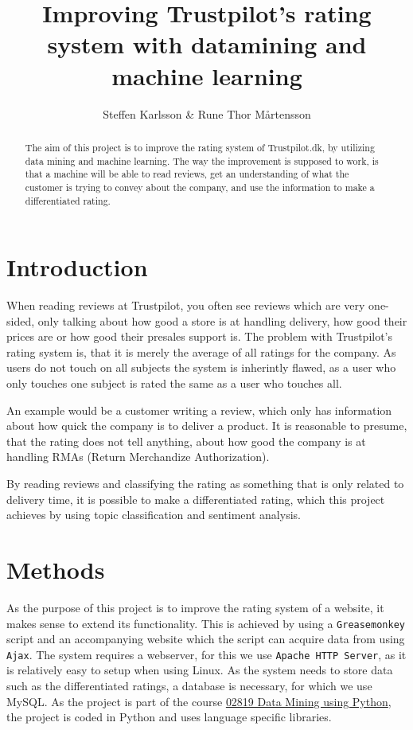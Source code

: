 \documentclass[10pt]{IEEEtran}
\title{Improving Trustpilot's rating system with datamining and machine learning}
\author{Steffen Karlsson \& Rune Thor Mårtensson}
\begin{document}
\maketitle

\begin{abstract}
The aim of this project is to improve the rating system of Trustpilot.dk, by utilizing data mining and machine learning. The way the improvement is supposed to work, is that a machine will be able to read reviews, get an understanding of what the customer is trying to convey about the company, and use the information to make a differentiated rating.
\end{abstract}

\section{Introduction}
When reading reviews at Trustpilot, you often see reviews which are very one-sided, only talking about how good a store is at handling delivery, how good their prices are or how good their presales support is. The problem with Trustpilot's rating system is, that it is merely the average of all ratings for the company. As users do not touch on all subjects the system is inherintly flawed, as a user who only touches one subject is rated the same as a user who touches all.

An example would be a customer writing a review, which only has information about how quick the company is to deliver a product. It is reasonable to presume, that the rating does not tell anything, about how good the company is at handling RMAs (Return Merchandize Authorization). 

By reading reviews and classifying the rating as something that is only related to delivery time, it is possible to make a differentiated rating, which this project achieves by using topic classification and sentiment analysis.

\section{Methods}
As the purpose of this project is to improve the rating system of a website, it makes sense to extend its functionality. This is achieved by using a \texttt{Greasemonkey} script and an accompanying website which the script can acquire data from using \texttt{Ajax}.
The system requires a webserver, for this we use \texttt{Apache HTTP Server}, as it is relatively easy to setup when using Linux. As the system needs to store data such as the differentiated ratings, a database is necessary, for which we use MySQL.
As the project is part of the course \href{\url{http://www.kurser.dtu.dk/02819.aspx?menulanguage=en-GB}}{02819 Data Mining using Python}, the project is coded in Python and uses language specific libraries.
\end{document}
